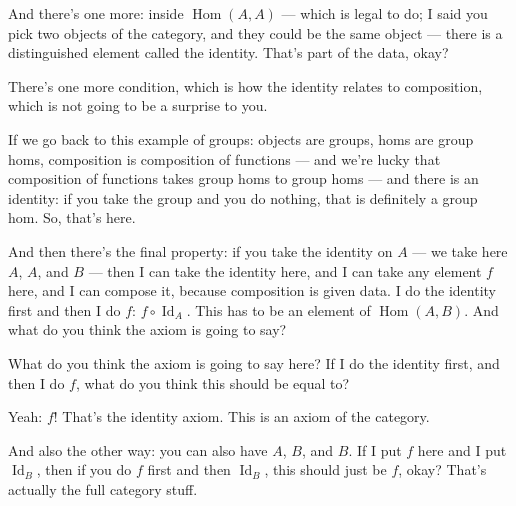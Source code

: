 \begin{speech}[01:14:06 - 01:16:30]
And there's one more: inside $\operatorname{Hom}(A, A)$ ---  which is legal to do; I said you pick two objects of the category, and they could be the same object --- there is a distinguished element called the identity. That's part of the data, okay?

There's one more condition, which is how the identity relates to composition, which is not going to be a surprise to you.

If we go back to this example of groups: objects are groups, homs are group homs, composition is composition of functions --- and we're lucky that composition of functions takes group homs to group homs --- and there is an identity: if you take the group and you do nothing, that is definitely a group hom. So, that's here.

And then there's the final property: if you take the identity on $A$ --- we take here $A$, $A$, and $B$  --- then I can take the identity here,  and I can take any element $f$ here,  and I can compose it, because composition is given data. I do the identity first and then I do $f$: $f \circ \operatorname{Id}_A$.  This has to be an element of $\operatorname{Hom}(A, B)$.  And what do you think the axiom is going to say?

What do you think the axiom is going to say here? If I do the identity first, and then I do $f$, what do you think this should be equal to?

Yeah: $f$!  That's the identity axiom. This is an axiom of the category.

And also the other way: you can also have $A$, $B$, and $B$.  If I put $f$ here and I put $\operatorname{Id}_B$,  then if you do $f$ first and then $\operatorname{Id}_B$, this should just be $f$, okay?  That's actually the full category stuff.
\end{speech}

